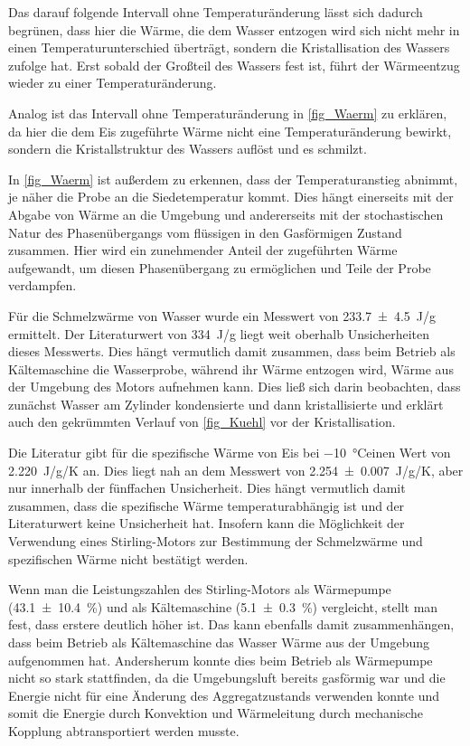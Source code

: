 \documentclass[
	a4paper,
	12pt,
	pagesize,
	ngerman
]{scrartcl}
\begin{document}
	Das darauf folgende Intervall ohne Temperaturänderung lässt sich dadurch begrünen, dass hier die Wärme, die dem Wasser entzogen wird sich nicht mehr in einen Temperaturunterschied überträgt, sondern die Kristallisation des Wassers zufolge hat.
	Erst sobald der Großteil des Wassers fest ist, führt der Wärmeentzug wieder zu einer Temperaturänderung.
	
	Analog ist das Intervall ohne Temperaturänderung in \cref{fig_Waerm} zu erklären, da hier die dem Eis zugeführte Wärme nicht eine Temperaturänderung bewirkt, sondern die Kristallstruktur des Wassers auflöst und es schmilzt.
	
	In \cref{fig_Waerm} ist außerdem zu erkennen, dass der Temperaturanstieg abnimmt, je näher die Probe an die Siedetemperatur kommt.
	Dies hängt einerseits mit der Abgabe von Wärme an die Umgebung und andererseits mit der stochastischen Natur des Phasenübergangs vom flüssigen in den Gasförmigen Zustand zusammen.
	Hier wird ein zunehmender Anteil der zugeführten Wärme aufgewandt, um diesen Phasenübergang zu ermöglichen und Teile der Probe verdampfen.
	
	Für die Schmelzwärme von Wasser wurde ein Messwert von \SI{233,7\pm 4,5}{J/g} ermittelt.
	Der Literaturwert \cite{schmelzWarm} von \SI{334}{J/g} liegt weit oberhalb Unsicherheiten dieses Messwerts.
	Dies hängt vermutlich damit zusammen, dass beim Betrieb als Kältemaschine die Wasserprobe, während ihr Wärme entzogen wird, Wärme aus der Umgebung des Motors aufnehmen kann.
	Dies ließ sich darin beobachten, dass zunächst Wasser am Zylinder kondensierte und dann kristallisierte und erklärt auch den gekrümmten Verlauf von \cref{fig_Kuehl} vor der Kristallisation.
	
	Die Literatur \cite{spezWarm} gibt für die spezifische Wärme von Eis bei \SI{-10}{\degreeCelsius}einen Wert von \SI{2,220}{J/g/K} an.
	Dies liegt nah an dem Messwert von \SI{2,254\pm 0,007}{J/g/K}, aber nur innerhalb der fünffachen Unsicherheit.
	Dies hängt vermutlich damit zusammen, dass die spezifische Wärme temperaturabhängig ist und der Literaturwert keine Unsicherheit hat. %
	Insofern kann die Möglichkeit der Verwendung eines Stirling-Motors zur Bestimmung der Schmelzwärme und spezifischen Wärme nicht bestätigt werden.
	
	Wenn man die Leistungszahlen des Stirling-Motors als Wärmepumpe (\SI{43,1+-10,4}{\%}) und als Kältemaschine (\SI{5,1 +- 0,3}{\%}) vergleicht, stellt man fest, dass erstere deutlich höher ist.
	Das kann ebenfalls damit zusammenhängen, dass beim Betrieb als Kältemaschine das Wasser Wärme aus der Umgebung aufgenommen hat.
	Andersherum konnte dies beim Betrieb als Wärmepumpe nicht so stark stattfinden, da die Umgebungsluft bereits gasförmig war und die Energie nicht für eine Änderung des Aggregatzustands verwenden konnte und somit die Energie durch Konvektion und Wärmeleitung durch mechanische Kopplung abtransportiert werden musste.
	
\end{document}
